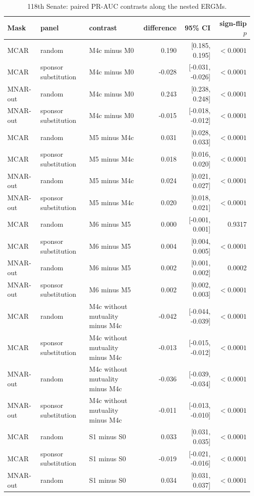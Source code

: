 \begin{table}[tbp]
\centering
\small
\caption{118th Senate: paired PR-AUC contrasts along the nested ERGMs.}
\label{tab:political-contrast}
\begin{tabular}{lllrrr}
\toprule
Mask & panel & contrast & difference & 95\% CI & sign-flip $p$ \\
\midrule
MCAR & random & M4c minus M0 & 0.190 & [0.185, 0.195] & $<0.0001$ \\
MCAR & sponsor substitution & M4c minus M0 & -0.028 & [-0.031, -0.026] & $<0.0001$ \\
MNAR-out & random & M4c minus M0 & 0.243 & [0.238, 0.248] & $<0.0001$ \\
MNAR-out & sponsor substitution & M4c minus M0 & -0.015 & [-0.018, -0.012] & $<0.0001$ \\
MCAR & random & M5 minus M4c & 0.031 & [0.028, 0.033] & $<0.0001$ \\
MCAR & sponsor substitution & M5 minus M4c & 0.018 & [0.016, 0.020] & $<0.0001$ \\
MNAR-out & random & M5 minus M4c & 0.024 & [0.021, 0.027] & $<0.0001$ \\
MNAR-out & sponsor substitution & M5 minus M4c & 0.020 & [0.018, 0.021] & $<0.0001$ \\
MCAR & random & M6 minus M5 & 0.000 & [-0.001, 0.001] & 0.9317 \\
MCAR & sponsor substitution & M6 minus M5 & 0.004 & [0.004, 0.005] & $<0.0001$ \\
MNAR-out & random & M6 minus M5 & 0.002 & [0.001, 0.002] & 0.0002 \\
MNAR-out & sponsor substitution & M6 minus M5 & 0.002 & [0.002, 0.003] & $<0.0001$ \\
MCAR & random & M4c without mutuality minus M4c & -0.042 & [-0.044, -0.039] & $<0.0001$ \\
MCAR & sponsor substitution & M4c without mutuality minus M4c & -0.013 & [-0.015, -0.012] & $<0.0001$ \\
MNAR-out & random & M4c without mutuality minus M4c & -0.036 & [-0.039, -0.034] & $<0.0001$ \\
MNAR-out & sponsor substitution & M4c without mutuality minus M4c & -0.011 & [-0.013, -0.010] & $<0.0001$ \\
MCAR & random & S1 minus S0 & 0.033 & [0.031, 0.035] & $<0.0001$ \\
MCAR & sponsor substitution & S1 minus S0 & -0.019 & [-0.021, -0.016] & $<0.0001$ \\
MNAR-out & random & S1 minus S0 & 0.034 & [0.031, 0.037] & $<0.0001$ \\

\end{tabular}
\end{table}
